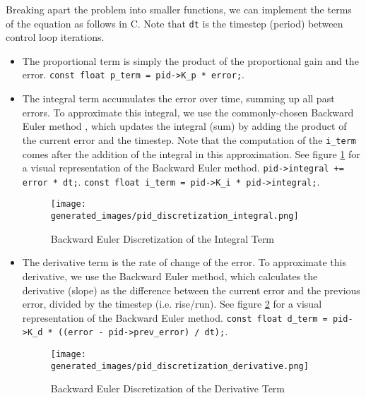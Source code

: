 \documentclass[main.tex]{subfiles}
\begin{document}
\noindent Breaking apart the problem into smaller functions, we can implement the terms of the equation as follows in C. Note that \texttt{dt} is the timestep (period) between control loop iterations.
\begin{itemize}
    \item The proportional term is simply the product of the proportional gain and the error. \newline
    \texttt{const float p\_term = pid->K\_p * error;}.
    \item The integral term accumulates the error over time, summing up all past errors. To approximate this integral, we use the commonly-chosen Backward Euler method \cite{AbramovitchPID}, which updates the integral (sum) by adding the product of the current error and the timestep. Note that the computation of the \texttt{i\_term} comes after the addition of the integral in this approximation. See figure \ref{fig:pid-backward-euler-integral} for a visual representation of the Backward Euler method.
    \newline
    \texttt{pid->integral += error * dt;}. \newline
    \texttt{const float i\_term = pid->K\_i * pid->integral;}.
    \begin{figure}[H]
        \centering
        \texttt{[image: generated\_images/pid\_discretization\_integral.png]}
        \caption{Backward Euler Discretization of the Integral Term}
        \label{fig:pid-backward-euler-integral}
    \end{figure}

    \item The derivative term is the rate of change of the error. To approximate this derivative, we use the Backward Euler method, which calculates the derivative (slope) as the difference between the current error and the previous error, divided by the timestep (i.e. rise/run). See figure \ref{fig:pid-backward-euler-derivative} for a visual representation of the Backward Euler method.
    \newline
    \texttt{const float d\_term = pid->K\_d * ((error - pid->prev\_error) / dt);}.
    \begin{figure}[H]
        \centering
        \texttt{[image: generated\_images/pid\_discretization\_derivative.png]}
        \caption{Backward Euler Discretization of the Derivative Term}
        \label{fig:pid-backward-euler-derivative}
    \end{figure}

\end{itemize}
\end{document}
